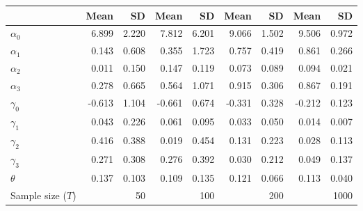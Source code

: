 
\begin{tabular}[t]{lrrrrrrrr}
\toprule
  & Mean & SD & Mean  & SD  & Mean   & SD   & Mean    & SD   \\
\midrule
$\alpha_{0}$ & 6.899 & 2.220 & 7.812 & 6.201 & 9.066 & 1.502 & 9.506 & 0.972\\
$\alpha_{1}$ & 0.143 & 0.608 & 0.355 & 1.723 & 0.757 & 0.419 & 0.861 & 0.266\\
$\alpha_{2}$ & 0.011 & 0.150 & 0.147 & 0.119 & 0.073 & 0.089 & 0.094 & 0.021\\
$\alpha_{3}$ & 0.278 & 0.665 & 0.564 & 1.071 & 0.915 & 0.306 & 0.867 & 0.191\\
$\gamma_{0}$ & -0.613 & 1.104 & -0.661 & 0.674 & -0.331 & 0.328 & -0.212 & 0.123\\
$\gamma_{1}$ & 0.043 & 0.226 & 0.061 & 0.095 & 0.033 & 0.050 & 0.014 & 0.007\\
$\gamma_{2}$ & 0.416 & 0.388 & 0.019 & 0.454 & 0.131 & 0.223 & 0.028 & 0.113\\
$\gamma_{3}$ & 0.271 & 0.308 & 0.276 & 0.392 & 0.030 & 0.212 & 0.049 & 0.137\\
$\theta$ & 0.137 & 0.103 & 0.109 & 0.135 & 0.121 & 0.066 & 0.113 & 0.040\\
Sample size ($T$) &  & 50 &  & 100 &  & 200 &  & 1000\\
\bottomrule
\end{tabular}
